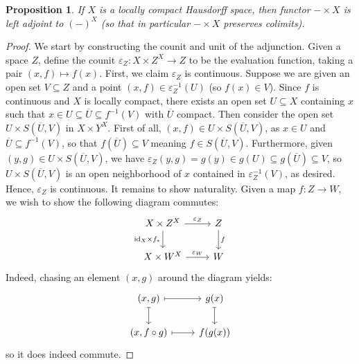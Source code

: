 \documentclass{amsart}
\newcommand{\ol}{\overline}
\theoremstyle{plain}
\newtheorem{proposition}[theorem]{Proposition}
\theoremstyle{definition}
\newcommand{\sseq}{\subseteq}
\newcommand{\0}{\mathbf{0}}
\newcommand{\id}{\mathrm{id}}
\renewcommand{\ol}{\overline}
\newcommand{\vare}{\varepsilon}
\renewcommand{\(}{\left(}
\renewcommand{\)}{\right)}
\begin{document}
\begin{proposition}\label{locally_compact_hausdorff_spaces_are_exponentiable}
  If $X$ is a locally compact Hausdorff space, then functor $-\times X$ is left adjoint to $(-)^X$ (so that in particular $-\times X$ preserves colimits).
\end{proposition}
\begin{proof}
  We start by constructing the counit and unit of the adjunction. Given a space $Z$, define the counit $\vare_Z:X\times Z^X\to Z$ to be the evaluation function, taking a pair $(x,f)\mapsto f(x)$. First, we claim $\vare_Z$ is continuous. Suppose we are given an open set $V\sseq Z$ and a point $(x,f)\in \vare_Z^{-1}(U)$ (so $f(x)\in V$). Since $f$ is continuous and $X$ is locally compact, there exists an open set $U\sseq X$ containing $x$ such that $x\in U\sseq\ol U\sseq f^{-1}(V)$ with $\ol U$ compact. Then consider the open set $U\times S(\ol U,V)$ in $X\times Y^X$. First of all, $(x,f)\in U\times S(\ol U,V)$, as $x\in U$ and $\ol U\sseq f^{-1}(V)$, so that $f(\ol U)\sseq V$ meaning $f\in S(\ol U,V)$. Furthermore, given $(y,g)\in U\times S(\ol U,V)$, we have $\vare_Z(y,g)=g(y)\in g(U)\sseq g(\ol U)\sseq V$, so $U\times S(\ol U,V)$ is an open neighborhood of $x$ contained in $\vare_Z^{-1}(V)$, as desired. Hence, $\vare_Z$ is continuous. It remains to show naturality. Given a map $f:Z\to W$, we wish to show the following diagram commutes:
  \[\begin{tikzcd}
    {X\times Z^X} & Z \\
    {X\times W^X} & W
    \arrow["{\vare_Z}", from=1-1, to=1-2]
    \arrow["{\id_X\times f_*}"', from=1-1, to=2-1]
    \arrow["{\vare_W}", from=2-1, to=2-2]
    \arrow["f", from=1-2, to=2-2]
  \end{tikzcd}\]
  Indeed, chasing an element $(x,g)$ around the diagram yields:
  \[\begin{tikzcd}
    {(x,g)} & {g(x)} \\
    {(x,f\circ g)} & {f(g(x))}
    \arrow[maps to, from=1-1, to=1-2]
    \arrow[maps to, from=1-2, to=2-2]
    \arrow[maps to, from=1-1, to=2-1]
    \arrow[maps to, from=2-1, to=2-2]
  \end{tikzcd}\]
  so it does indeed commute.


\end{proof}
\end{document}

